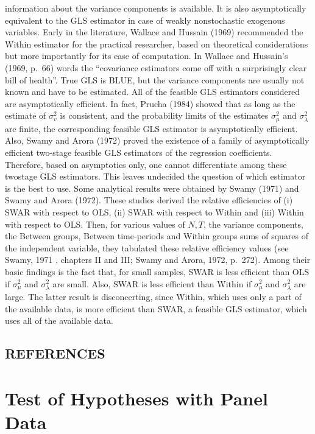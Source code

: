 \documentclass[
]{book}
\begin{document}
information about the variance components is available. It is also asymptotically equivalent to the GLS estimator in case of weakly nonstochastic exogenous variables. Early in the literature, Wallace and Hussain (1969) recommended the Within estimator for the practical researcher, based on theoretical considerations but more importantly for its ease of computation. In Wallace and Hussain's (1969, p.~66) words the ``covariance estimators come off with a surprisingly clear bill of health''. True GLS is BLUE, but the variance components are usually not known and have to be estimated. All of the feasible GLS estimators considered are asymptotically efficient. In fact, Prucha (1984) showed that as long as the estimate of \(\sigma_{v}^{2}\) is consistent, and the probability limits of the estimates \(\sigma_{\mu}^{2}\) and \(\sigma_{\lambda}^{2}\) are finite, the corresponding feasible GLS estimator is asymptotically efficient. Also, Swamy and Arora (1972) proved the existence of a family of asymptotically efficient two-stage feasible GLS estimators of the regression coefficients. Therefore, based on asymptotics only, one cannot differentiate among these twostage GLS estimators. This leaves undecided the question of which estimator is the best to use. Some analytical results were obtained by Swamy (1971) and Swamy and Arora (1972). These studies derived the relative efficiencies of (i) SWAR with respect to OLS, (ii) SWAR with respect to Within and (iii) Within with respect to OLS. Then, for various values of \(N, T\), the variance components, the Between groups, Between time-periods and Within groups sums of squares of the independent variable, they tabulated these relative efficiency values (see Swamy, 1971 , chapters II and III; Swamy and Arora, 1972, p.~272). Among their basic findings is the fact that, for small samples, SWAR is less efficient than OLS if \(\sigma_{\mu}^{2}\) and \(\sigma_{\lambda}^{2}\) are small. Also, SWAR is less efficient than Within if \(\sigma_{\mu}^{2}\) and \(\sigma_{\lambda}^{2}\) are large. The latter result is disconcerting, since Within, which uses only a part of the available data, is more efficient than SWAR, a feasible GLS estimator, which uses all of the available data.

\hypertarget{references}{%
\section{REFERENCES}\label{references}}

\hypertarget{test-of-hypotheses-with-panel-data}{%
\chapter{Test of Hypotheses with Panel Data}\label{test-of-hypotheses-with-panel-data}}
\end{document}
